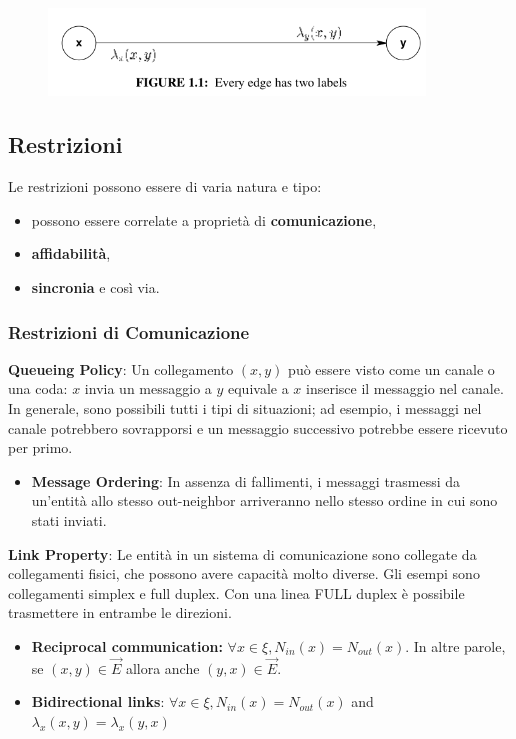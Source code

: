 \begin{figure}[H]
    \centering
    \hspace*{-0.75in}
    \includegraphics[width=10cm, keepaspectratio]{imgs/img1.png}
\end{figure}

\subsection{Restrizioni}
Le restrizioni possono essere di varia natura e tipo:
\begin{itemize}
    \item possono essere correlate a proprietà di \textbf{comunicazione}, 
    \item \textbf{affidabilità}, 
    \item \textbf{sincronia} e così via.
\end{itemize}

\subsubsection{Restrizioni di Comunicazione}
\textbf{Queueing Policy}: Un collegamento $(x, y)$ può essere visto come un canale o una coda: $x$ invia un messaggio a $y$ equivale a $x$ inserisce il messaggio nel canale.
In generale, sono possibili tutti i tipi di situazioni; ad esempio, i messaggi nel canale potrebbero sovrapporsi e un messaggio successivo potrebbe essere ricevuto per primo.
\begin{itemize}
    \item \textbf{Message Ordering}: In assenza di fallimenti, i messaggi trasmessi da un’entità allo stesso out-neighbor arriveranno nello stesso ordine in cui sono stati inviati.
\end{itemize}

\textbf{Link Property}: Le entità in un sistema di comunicazione sono collegate da collegamenti fisici, che possono avere capacità molto diverse. Gli esempi sono collegamenti simplex e full duplex. Con una linea FULL duplex è possibile trasmettere in entrambe le direzioni.
\begin{itemize}
    \item \textbf{Reciprocal communication:} $\forall x \in \xi, N_{in}(x) = N_{out}(x)$. In altre parole, se $(x, y) \in \overrightarrow{E}$ allora anche $(y, x) \in \overrightarrow{E}$.
    \item \textbf{Bidirectional links}: $\forall x \in \xi, N_{in}(x) = N_{out}(x)$ and $\lambda_x (x, y) = \lambda_x (y,x)$ 
\end{itemize}

